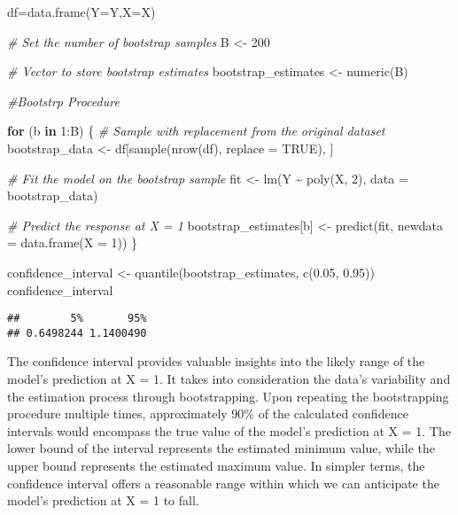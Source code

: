 \documentclass[
]{article}
\newenvironment{Shaded}{\begin{snugshade}}{\end{snugshade}}
\newcommand{\AttributeTok}[1]{\textcolor[rgb]{0.77,0.63,0.00}{#1}}
\newcommand{\CommentTok}[1]{\textcolor[rgb]{0.56,0.35,0.01}{\textit{#1}}}
\newcommand{\ConstantTok}[1]{\textcolor[rgb]{0.00,0.00,0.00}{#1}}
\newcommand{\ControlFlowTok}[1]{\textcolor[rgb]{0.13,0.29,0.53}{\textbf{#1}}}
\newcommand{\DecValTok}[1]{\textcolor[rgb]{0.00,0.00,0.81}{#1}}
\newcommand{\FloatTok}[1]{\textcolor[rgb]{0.00,0.00,0.81}{#1}}
\newcommand{\FunctionTok}[1]{\textcolor[rgb]{0.00,0.00,0.00}{#1}}
\newcommand{\NormalTok}[1]{#1}
\newcommand{\OtherTok}[1]{\textcolor[rgb]{0.56,0.35,0.01}{#1}}
\newcommand{\SpecialCharTok}[1]{\textcolor[rgb]{0.00,0.00,0.00}{#1}}
\begin{document}
\begin{Shaded}
\begin{Highlighting}[]
\NormalTok{df}\OtherTok{=}\FunctionTok{data.frame}\NormalTok{(}\AttributeTok{Y=}\NormalTok{Y,}\AttributeTok{X=}\NormalTok{X)}

\CommentTok{\# Set the number of bootstrap samples}
\NormalTok{B }\OtherTok{\textless{}{-}} \DecValTok{200}

\CommentTok{\# Vector to store bootstrap estimates}
\NormalTok{bootstrap\_estimates }\OtherTok{\textless{}{-}} \FunctionTok{numeric}\NormalTok{(B)  }

\CommentTok{\#Bootstrp Procedure}

\ControlFlowTok{for}\NormalTok{ (b }\ControlFlowTok{in} \DecValTok{1}\SpecialCharTok{:}\NormalTok{B) \{}
  \CommentTok{\# Sample with replacement from the original dataset}
\NormalTok{  bootstrap\_data }\OtherTok{\textless{}{-}}\NormalTok{ df[}\FunctionTok{sample}\NormalTok{(}\FunctionTok{nrow}\NormalTok{(df), }\AttributeTok{replace =} \ConstantTok{TRUE}\NormalTok{), ]}
  
  \CommentTok{\# Fit the model on the bootstrap sample}
\NormalTok{  fit }\OtherTok{\textless{}{-}} \FunctionTok{lm}\NormalTok{(Y }\SpecialCharTok{\textasciitilde{}} \FunctionTok{poly}\NormalTok{(X, }\DecValTok{2}\NormalTok{), }\AttributeTok{data =}\NormalTok{ bootstrap\_data)}
  
  \CommentTok{\# Predict the response at X = 1}
\NormalTok{  bootstrap\_estimates[b] }\OtherTok{\textless{}{-}} \FunctionTok{predict}\NormalTok{(fit, }\AttributeTok{newdata =} \FunctionTok{data.frame}\NormalTok{(}\AttributeTok{X =} \DecValTok{1}\NormalTok{))}
\NormalTok{\}}

\NormalTok{confidence\_interval }\OtherTok{\textless{}{-}} \FunctionTok{quantile}\NormalTok{(bootstrap\_estimates, }\FunctionTok{c}\NormalTok{(}\FloatTok{0.05}\NormalTok{, }\FloatTok{0.95}\NormalTok{))}
\NormalTok{confidence\_interval}
\end{Highlighting}
\end{Shaded}

\begin{verbatim}
##        5%       95% 
## 0.6498244 1.1400490
\end{verbatim}

The confidence interval provides valuable insights into the likely range
of the model's prediction at X = 1. It takes into consideration the
data's variability and the estimation process through bootstrapping.
Upon repeating the bootstrapping procedure multiple times, approximately
90\% of the calculated confidence intervals would encompass the true
value of the model's prediction at X = 1. The lower bound of the
interval represents the estimated minimum value, while the upper bound
represents the estimated maximum value. In simpler terms, the confidence
interval offers a reasonable range within which we can anticipate the
model's prediction at X = 1 to fall.
\end{document}
